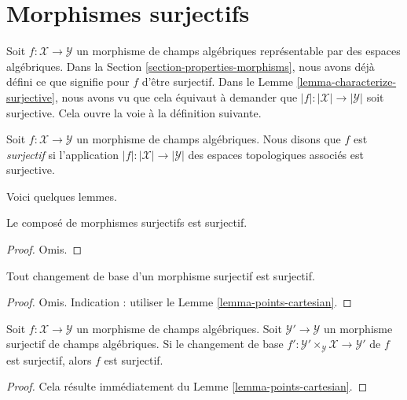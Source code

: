 \section{Morphismes surjectifs}
\label{section-surjective}

\noindent
Soit $f : \mathcal{X} \to \mathcal{Y}$ un morphisme de champs algébriques
représentable par des espaces algébriques. Dans la
Section \ref{section-properties-morphisms},
nous avons déjà défini ce que signifie pour $f$ d'être surjectif. Dans le
Lemme \ref{lemma-characterize-surjective},
nous avons vu que cela équivaut à demander que
$|f| : |\mathcal{X}| \to |\mathcal{Y}|$ soit surjective.
Cela ouvre la voie à la définition suivante.

\begin{definition}
\label{definition-surjective}
Soit $f : \mathcal{X} \to \mathcal{Y}$ un morphisme de champs algébriques.
Nous disons que $f$ est {\it surjectif} si l'application
$|f| : |\mathcal{X}| \to |\mathcal{Y}|$ des espaces topologiques associés
est surjective.
\end{definition}

\noindent
Voici quelques lemmes.

\begin{lemma}
\label{lemma-composition-surjective}
Le composé de morphismes surjectifs est surjectif.
\end{lemma}

\begin{proof}
Omis.
\end{proof}

\begin{lemma}
\label{lemma-base-change-surjective}
Tout changement de base d'un morphisme surjectif est surjectif.
\end{lemma}

\begin{proof}
Omis. Indication : utiliser le
Lemme \ref{lemma-points-cartesian}.
\end{proof}

\begin{lemma}
\label{lemma-descent-surjective}
Soit $f : \mathcal{X} \to \mathcal{Y}$ un morphisme de champs algébriques.
Soit $\mathcal{Y}' \to \mathcal{Y}$ un morphisme surjectif de champs
algébriques. Si le changement de base $f' : \mathcal{Y}' \times_\mathcal{Y} \mathcal{X}
\to \mathcal{Y}'$ de $f$ est surjectif, alors $f$ est surjectif.
\end{lemma}

\begin{proof}
Cela résulte immédiatement du
Lemme \ref{lemma-points-cartesian}.
\end{proof}

